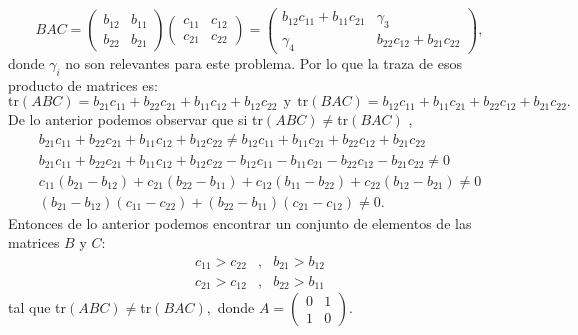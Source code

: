 \documentclass[11pt,letterpaper]{article}
\newcommand{\tr}{\text{tr}}
\begin{document}
\begin{enumerate}
\begin{equation*}
BAC=\left( \begin{array}{cc}
b_{12}&b_{11} \\
b_{22}&b_{21}
\end{array} \right)\left( \begin{array}{cc}
c_{11}&c_{12} \\
c_{21}&c_{22}
\end{array} \right)=
\left( \begin{array}{cc}
b_{12}c_{11}+b_{11}c_{21}&\gamma_3 \\
\gamma_4& b_{22}c_{12}+b_{21}c_{22}
\end{array} \right),
\end{equation*}
donde $\gamma_i$ no son relevantes para este problema. Por lo que la traza de esos producto de matrices es:
\begin{equation*}
\tr (ABC)= b_{21}c_{11}+b_{22}c_{21}+b_{11}c_{12}+b_{12}c_{22}\ \ \text{y}\ \ \tr (BAC)= b_{12}c_{11}+b_{11}c_{21}+ b_{22}c_{12}+b_{21}c_{22}.
\end{equation*}
De lo anterior podemos observar que si tr$(ABC)\neq$tr$(BAC)$ ,
\begin{equation*}
\begin{array}{ccc}
b_{21}c_{11}+b_{22}c_{21}+b_{11}c_{12}+b_{12}c_{22} \neq 
b_{12}c_{11}+b_{11}c_{21}+ b_{22}c_{12}+b_{21}c_{22}\\
b_{21}c_{11}+b_{22}c_{21}+b_{11}c_{12}+b_{12}c_{22}-b_{12}c_{11}-b_{11}c_{21}-b_{22}c_{12}-b_{21}c_{22}\neq 0\\
c_{11}(b_{21}-b_{12})+c_{21}(b_{22}-b_{11})+c_{12}(b_{11}-b_{22})+c_{22}(b_{12}-b_{21})\neq 0\\
(b_{21}-b_{12})(c_{11}-c_{22})+(b_{22}-b_{11})(c_{21}-c_{12})\neq 0.
\end{array}
\end{equation*}
Entonces de lo anterior podemos encontrar un conjunto de elementos de las matrices $B$ y $C$:
\begin{equation*}
\begin{array}{ccc}
c_{11}>c_{22} &,& b_{21}>b_{12}\\
c_{21}>c_{12} &,& b_{22}>b_{11}
\end{array}
\end{equation*} 
tal que tr$(ABC)\neq$tr$(BAC), $ donde $A=\left( \begin{array}{cc}
0&1 \\
1&0
\end{array} \right).$\\

\end{enumerate}
\end{document}
